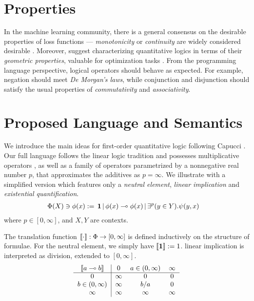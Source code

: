 \documentclass[sigplan, screen, review, nonacm]{acmart}
\begin{document}
\section{Properties}
In the machine learning community, there is a general consensus on the desirable properties of loss functions --- \textit{monotonicity} or \textit{continuity} are widely considered desirable \cite{van2022analyzing}. Moreover, \citeauthor{varnai2020robustness} suggest characterizing quantitative logics in terms of their \textit{geometric properties}, valuable for optimization tasks \cite{varnai2020robustness}. From the programming language perspective, logical operators should behave as expected. For example, negation should meet \textit{De Morgan's laws}, while conjunction and disjunction should satisfy the usual properties of \textit{commutativity} and \textit{associativity}. 

\section{Proposed Language and Semantics}
 We introduce the main ideas for first-order quantitative logic following Capucci \cite{capucci2024quantifiers}. Our full language follows the linear logic tradition and possesses multiplicative operators \citep{Wadler1993}, as well as a family of operators parametrized by a nonnegative real number $p$, that approximates the additives as $p = \infty$. We illustrate with a simplified version which features only a \textit{neutral element}, \textit{linear implication} and \textit{existential quantification}.
\begin{equation*}
    \begin{split}
        &\Phi(X) \ni \phi(x) := \, \textbf{1} \, |\,  \phi(x) \multimap{} \phi(x) \,
        |\, \exists^{p}(y \in Y).\psi(y,x)
    \end{split}
\end{equation*}
where $p \in [0,\infty]$, and $X, Y$ are contexts.

The translation function $\llbracket \cdot \rrbracket : \Phi \rightarrow [0,\infty]$ is defined inductively on the structure of formulae. For the neutral element, we simply have $\llbracket \textbf{1} \rrbracket := 1$. linear implication is interpreted as division, extended to $[0,\infty]$. 
 \begin{equation*}
		\begin{tabular}{c|ccc}
			$\m{a \ediv{} b}$ & $0$ & $a \in (0,\infty)$ & $\infty$\\
			\cline{1-4}
			$0$ 			   & $\infty$ & $0$ 		& $0$\\
			$b \in (0,\infty)$ & $\infty$ & $b/a$		& $0$\\
			$\infty$ 		   & $\infty$ & $\infty$ & $\infty$
		\end{tabular}
	\end{equation*}
\end{document}
